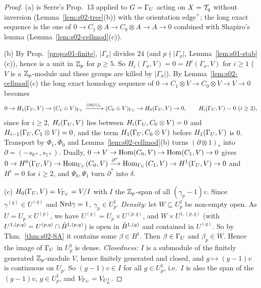 \begin{proof}
(a) is Serre's Prop.~13 applied to $G=\Gamma_U$ acting on $X=\mathcal{T}_q$ without inversion (Lemma~\ref{lem:s02-tree}(b)) with the orientation $\mathrm{edge}^+$; the
long exact sequence is the one of $0\to C_1\otimes A\to C_0\otimes A\to A\to0$ combined with Shapiro's lemma (Lemma~\ref{lem:s02-cellmod}(c)).

(b) By Prop.~\ref{prop:s01-finite}, $|\Gamma_\sigma|$ divides $24$ (and $p\nmid|\Gamma_\sigma|$, Lemma~\ref{lem:s01-stab}(c)), hence is a unit in $\mathbb{Z}_p$ for $p\ge5$. So $H_i(\Gamma_\sigma,V)=0=H^i(\Gamma_\sigma,V)$ for $i\ge1$ ($V$ is a
$\mathbb{Z}_p$-module and these groups are killed by $|\Gamma_\sigma|$). By Lemma~\ref{lem:s02-cellmod}(c) the long exact homology sequence of
$0\to C_1\otimes V\to C_0\otimes V\to V\to0$ becomes
\[0\to H_1(\Gamma_U,V)\to(C_1\otimes V)_{\Gamma_U}\xrightarrow{(\partial\otimes1)_*}(C_0\otimes V)_{\Gamma_U}\to H_0(\Gamma_U,V)\to0,\qquad H_i(\Gamma_U,V)=0\ (i\ge2),\]
since for $i\ge2$, $H_i(\Gamma_U,V)$ lies between $H_i(\Gamma_U,C_0\otimes V)=0$ and $H_{i-1}(\Gamma_U,C_1\otimes V)=0$, and the term $H_1(\Gamma_U,C_0\otimes V)$ before $H_1(\Gamma_U,V)$ is $0$.
Transport by $\Phi_1,\Phi_0$ and Lemma~\ref{lem:s02-cellmod}(b) turns $(\partial\otimes1)_*$ into $\partial=(-s_{0*},s_{1*})$. Dually,
$0\to V\to\operatorname{Hom}(C_0,V)\to\operatorname{Hom}(C_1,V)\to0$ gives
$0\to H^0(\Gamma_U,V)\to\operatorname{Hom}_{\Gamma_U}(C_0,V)\xrightarrow{\partial^*}\operatorname{Hom}_{\Gamma_U}(C_1,V)\to H^1(\Gamma_U,V)\to0$ and $H^i=0$ for $i\ge2$, and $\Psi_0,\Psi_1$ turn $\partial^*$ into $\delta$.

(c) $H_0(\Gamma_U,V)=V_{\Gamma_U}=V/I$ with $I$ the $\mathbb{Z}_p$-span of all $(\gamma_p-1)v$. Since $\gamma^{(q)}\in U^{(q)}$ and $\mathrm{Nrd}\gamma=1$, $\gamma_p\in U^1_p$.
\emph{Density:} let $W\subseteq U_p^1$ be non-empty open. As $U=U_p\times U^{(p)}$, we have $U^{(q)}=U_p\times U^{(p,q)}$, and $W\times U^{1,(p,q)}$ (with
$U^{1,(p,q)}=U^{(p,q)}\cap\hat{B}^{1,(p,q)}$) is open in $\hat{B}^{1,(q)}$ and contained in $U^{(q)}$. So by Thm.~\ref{thm:s02-SA} it contains some $\beta\in B^1$.
Then $\beta\in\Gamma_U$ and $\beta_p\in W$. Hence the image of $\Gamma_U$ in $U^1_p$ is dense.
\emph{Closedness:} $I$ is a submodule of the finitely generated $\mathbb{Z}_p$-module $V$, hence finitely generated and closed, and $g\mapsto(g-1)v$ is continuous on $U_p$. So
$(g-1)v\in I$ for all $g\in U_p^1$, i.e.\ $I$ is also the span of the $(g-1)v$, $g\in U^1_p$, and $V_{\Gamma_U}=V_{U^1_p}$.


\end{proof}
